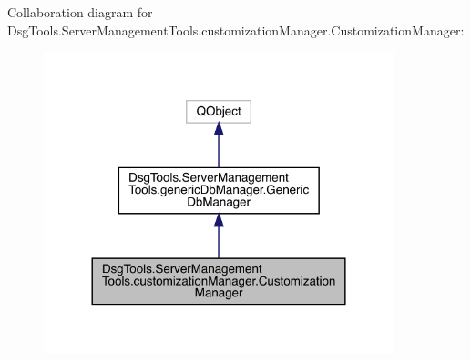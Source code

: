 Collaboration diagram for Dsg\+Tools.\+Server\+Management\+Tools.\+customization\+Manager.\+Customization\+Manager\+:
\nopagebreak
\begin{figure}[H]
\begin{center}
\leavevmode
\includegraphics[width=288pt]{class_dsg_tools_1_1_server_management_tools_1_1customization_manager_1_1_customization_manager__coll__graph}
\end{center}
\end{figure}
